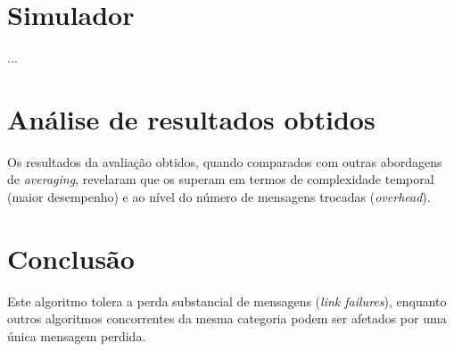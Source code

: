 \documentclass[a4paper]{article}
\begin{document}
\section{Simulador} \label{sec:Simulator}
\large{
	...
}

\section{Análise de resultados obtidos} \label{sec:Analysis of results}
\large{
	Os resultados da avaliação obtidos, quando comparados com outras abordagens de \textit{averaging}, revelaram que os superam em termos de complexidade temporal (maior desempenho) e ao nível do número de mensagens trocadas (\textit{overhead}).
}

\section{Conclusão} \label{sec:Conclusion}
\large{
	Este algoritmo tolera a perda substancial de mensagens (\textit{link failures}), enquanto outros algoritmos concorrentes da mesma categoria podem ser afetados por uma única mensagem perdida.
}

\printbibliography[heading=bibintoc]
\end{document}
